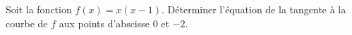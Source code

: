 
\begin{exercice}\label{exosmath-0401}

    Soit la fonction \( f(x)=x(x-1)\). Déterminer l'équation de la tangente à la courbe de \( f\) aux points d'abscisse \( 0\) et \( -2\).

\end{exercice}

